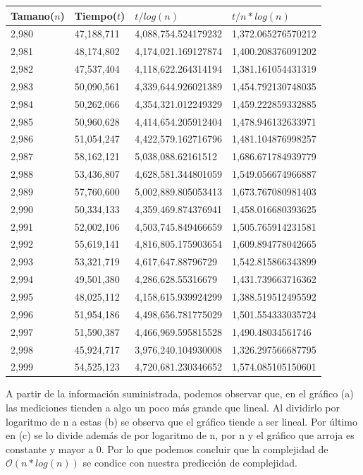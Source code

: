 \begin{table}[H]
\parbox{0.3\textwidth}{
    \begin{tabular}{ | l | l | l | l |}
    \hline
Tamano($n$) & Tiempo($t$) & $t / log(n)$ & $t / n*log(n)$ \\ \hline
2,980 & 47,188,711 & 4,088,754.524179232 & 1,372.065276570212 \\ \hline
2,981 & 48,174,802 & 4,174,021.169127874 & 1,400.208376091202 \\ \hline
2,982 & 47,537,404 & 4,118,622.264314194 & 1,381.161054431319 \\ \hline
2,983 & 50,090,561 & 4,339,644.926021389 & 1,454.792130748035 \\ \hline
2,984 & 50,262,066 & 4,354,321.012249329 & 1,459.222859332885 \\ \hline
2,985 & 50,960,628 & 4,414,654.205912404 & 1,478.946132633971 \\ \hline
2,986 & 51,054,247 & 4,422,579.162716796 & 1,481.104876998257 \\ \hline
2,987 & 58,162,121 & 5,038,088.62161512 & 1,686.671784939779 \\ \hline
2,988 & 53,436,807 & 4,628,581.344801059 & 1,549.056674966887 \\ \hline
2,989 & 57,760,600 & 5,002,889.805053413 & 1,673.767080981403 \\ \hline
2,990 & 50,334,133 & 4,359,469.874376941 & 1,458.016680393625 \\ \hline
2,991 & 52,002,106 & 4,503,745.849466659 & 1,505.765914231581 \\ \hline
2,992 & 55,619,141 & 4,816,805.175903654 & 1,609.894778042665 \\ \hline
2,993 & 53,321,719 & 4,617,647.88796729 & 1,542.815866343899 \\ \hline
2,994 & 49,501,380 & 4,286,628.55316679 & 1,431.739663716362 \\ \hline
2,995 & 48,025,112 & 4,158,615.939924299 & 1,388.519512495592 \\ \hline
2,996 & 51,954,186 & 4,498,656.781775029 & 1,501.554333035724 \\ \hline
2,997 & 51,590,387 & 4,466,969.595815528 & 1,490.48034561746 \\ \hline
2,998 & 45,924,717 & 3,976,240.104930008 & 1,326.297566687795 \\ \hline
2,999 & 54,525,123 & 4,720,681.230346652 & 1,574.085105150601 \\ \hline
    \end{tabular}
}
\end{table}



A partir de la información suministrada, podemos observar que, en el gráfico (a) las mediciones tienden a algo un poco más grande que lineal. Al dividirlo por logaritmo de n a estas (b) se observa que el gráfico tiende a ser lineal. Por último en (c) se lo divide además de por logaritmo de n, por n y el gráfico que arroja es constante y mayor a 0. Por lo que podemos concluir que la complejidad de $\mathcal{O}(n*log(n))$ se condice con nuestra predicción de complejidad.